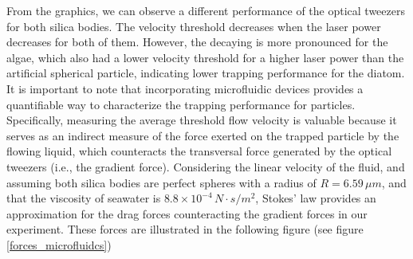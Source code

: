\documentclass[letterpaper,12pt,oneside]{book}
\begin{document}
\noindent From the graphics, we can observe a different performance of the optical tweezers for both silica bodies. The velocity threshold decreases when the laser power decreases for both of them. However, the decaying is more pronounced for the algae, which also had a lower velocity threshold for a higher laser power than the artificial spherical particle, indicating lower trapping performance for the diatom. It is important to note that incorporating microfluidic devices provides a quantifiable way to characterize the trapping performance for particles.
Specifically, measuring the average threshold flow velocity is valuable because it serves as an indirect measure of the force exerted on the trapped particle by the flowing liquid, which counteracts the transversal force generated by the optical tweezers (i.e., the gradient force). Considering the linear velocity of the fluid, and assuming both silica bodies are perfect spheres with a radius of \( R = 6.59 \, \mu m \), and that the viscosity of seawater is \( 8.8 \times 10^{-4} \, N \cdot s/m^2 \), Stokes' law provides an approximation for the drag forces counteracting the gradient forces in our experiment.  These forces are illustrated in the following figure (see figure \ref{forces_microfluidcs})
\end{document}
